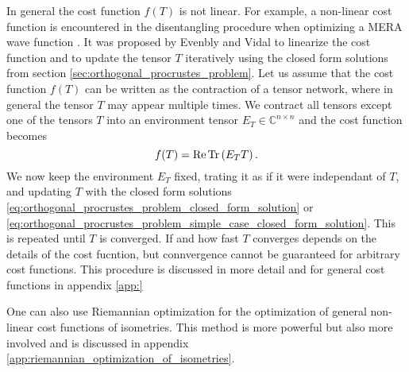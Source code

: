 In general the cost function $f(T)$ is not linear. For example, a non-linear cost function is encountered in the disentangling procedure when optimizing a MERA wave function \cite{}. It was proposed by Evenbly and Vidal \cite{} to linearize the cost function and to update the tensor $T$ iteratively using the closed form solutions from section \ref{sec:orthogonal_procrustes_problem}. Let us assume that the cost function $f(T)$ can be written as the contraction of a tensor network, where in general the tensor $T$ may appear multiple times. We contract all tensors except one of the tensors $T$ into an environment tensor $E_T \in\mathbb{C}^{n\times n}$ and the cost function becomes
\begin{equation}
	f(T)=\operatorname{Re}\operatorname{Tr}\left(E_TT\right).
\end{equation}
We now keep the environment $E_T$ fixed, trating it as if it were independant of $T$, and updating $T$ with the closed form solutions \eqref{eq:orthogonal_procrustes_problem_closed_form_solution} or \eqref{eq:orthogonal_procrustes_problem_simple_case_closed_form_solution}. This is repeated until $T$ is converged. If and how fast $T$ converges depends on the details of the cost fucntion, but connvergence cannot be guaranteed for arbitrary cost functions. This procedure is discussed in more detail and for general cost functions in appendix \ref{app:}\par
One can also use Riemannian optimization for the optimization of general non-linear cost functions of isometries. This method is more powerful but also more involved and is discussed in appendix \ref{app:riemannian_optimization_of_isometries}.